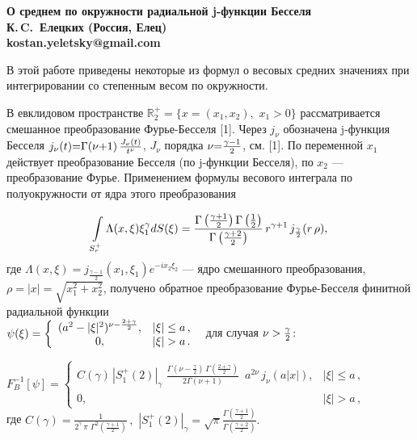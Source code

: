 
\begin{center}
	\bf О среднем по окружности радиальной j-функции Бесселя \\
	К.\,C.~Елецких (Россия, Елец)\\
	kostan.yeletsky@gmail.com\\
\end{center}


В этой работе приведены некоторые из формул о весовых средних значениях при интегрировании со степенным весом по окружности.

В евклидовом пространстве $\mathbb{R}_2^+=\{x=(x_1,x_2),\,\,x_1>0\}$ рассматривается смешанное преобразование Фурье-Бесселя [1]. Через $j_\nu$ обозначена j-функция Бесселя
$j_\nu(t){=}
\Gamma(\nu{+}1)\,{J_\nu(t)\over t^\nu}$, $J_\nu$ порядка $\nu{=}{\gamma-1\over2}$, см. [1]. По  переменной $x_1$ действует преобразование Бесселя (по j-функции Бесселя), по $x_2$ --- преобразование Фурье. Применением  формулы  весового интеграла по полуокружности от ядра этого преобразования

$$\int\limits_{S_r^+}{\Lambda(x,\xi)\xi_1^\gamma}dS(\xi)
=\frac{\Gamma\left(\gamma+1\over2\right)\Gamma\left(1\over2\right)}{\Gamma\left(\gamma+2\over2\right)}\,r^{\gamma+1}\,j_{\frac{\gamma}{2}}(r\,\rho),$$
где $\Lambda(x,\xi)=j_\frac{\gamma-1}{2}(x_1,\xi_1)e^{-ix_2\xi_2}$ --- ядро смешанного преобразования, $\rho=|x|=\sqrt{x_1^2+x_2^2}$,
получено обратное преобразование Фурье-Бесселя финитной радиальной функции\\ $\psi(\xi)=\left\{ \begin{array}{cc}
          (a^2-|\xi|^2)^{{\nu-{2+\gamma\over2}}} , & |\xi|\le a\,, \\
					   0  ,& |\xi|>a\,.
\end{array}\right.\,\,$ для случая $\nu>{\gamma\over2}$:

$F^{-1}_B[\psi]=\left\{ \begin{array}{cc}
          C(\gamma)\,|S^+_1(2)|_\gamma \,\,\frac{\Gamma\left(\nu-\frac{\gamma}{2}\right)\,\Gamma\left(\frac{2+\gamma}{2}\right)}
{2\Gamma\left(\nu+1\right)}\,\,\,a^{2\nu}\,
j_{\nu}(a|x|) , & |\xi|\le a\,, \\
					   0  ,& |\xi|>a\,,
\end{array}\right.\,\,$\\
где $C(\gamma)=\frac{1}{2^{\gamma}\,\pi\,\,\Gamma^2\left(\frac{\gamma+1}{2}\right)}\,,$ $|S^+_1(2)|_\gamma=\sqrt{\pi}\frac{\Gamma(\frac{\gamma+1}{2})}{\Gamma(\frac{\gamma+2}{2})}.$

